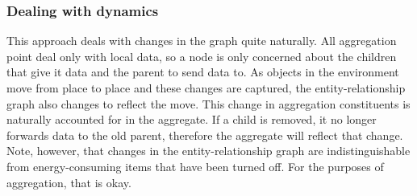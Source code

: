 





\subsubsection{Dealing with dynamics}
\label{sec:dynagg}

This approach deals with changes in the graph quite naturally.  All aggregation point deal only with local data, so
a node is only concerned about the children that give it data and the parent to send data to.  As objects in the environment
move from place to place and these changes are captured, the entity-relationship graph also changes to reflect the move.
This change in aggregation constituents is naturally accounted for in the aggregate.  If a child is removed,
it no longer forwards data to the old parent, therefore the aggregate will reflect that change.
Note, however, that changes in the entity-relationship graph are indistinguishable from energy-consuming items that have
been turned off.  For the purposes of aggregation, that is okay.







